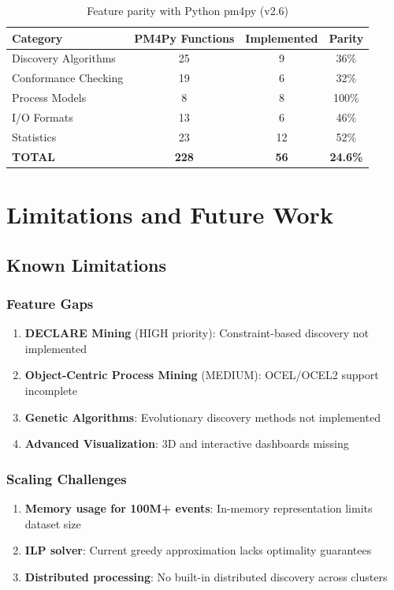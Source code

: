 \documentclass[11pt,twocolumn]{article}
\begin{document}
\begin{table}[H]
\centering
\begin{tabular}{lccc}
\toprule
\textbf{Category} & \textbf{PM4Py Functions} & \textbf{Implemented} & \textbf{Parity} \\
\midrule
Discovery Algorithms & 25 & 9 & 36\% \\
Conformance Checking & 19 & 6 & 32\% \\
Process Models & 8 & 8 & 100\% \\
I/O Formats & 13 & 6 & 46\% \\
Statistics & 23 & 12 & 52\% \\
\midrule
\textbf{TOTAL} & \textbf{228} & \textbf{56} & \textbf{24.6\%} \\
\bottomrule
\end{tabular}
\caption{Feature parity with Python pm4py (v2.6)}
\label{tbl:parity}
\end{table}

\section{Limitations and Future Work}
\label{sec:limitations}

\subsection{Known Limitations}

\subsubsection{Feature Gaps}
\begin{enumerate}
    \item \textbf{DECLARE Mining} (HIGH priority): Constraint-based discovery not implemented
    \item \textbf{Object-Centric Process Mining} (MEDIUM): OCEL/OCEL2 support incomplete
    \item \textbf{Genetic Algorithms}: Evolutionary discovery methods not implemented
    \item \textbf{Advanced Visualization}: 3D and interactive dashboards missing
\end{enumerate}

\subsubsection{Scaling Challenges}
\begin{enumerate}
    \item \textbf{Memory usage for 100M+ events}: In-memory representation limits dataset size
    \item \textbf{ILP solver}: Current greedy approximation lacks optimality guarantees
    \item \textbf{Distributed processing}: No built-in distributed discovery across clusters
\end{enumerate}
\end{document}
